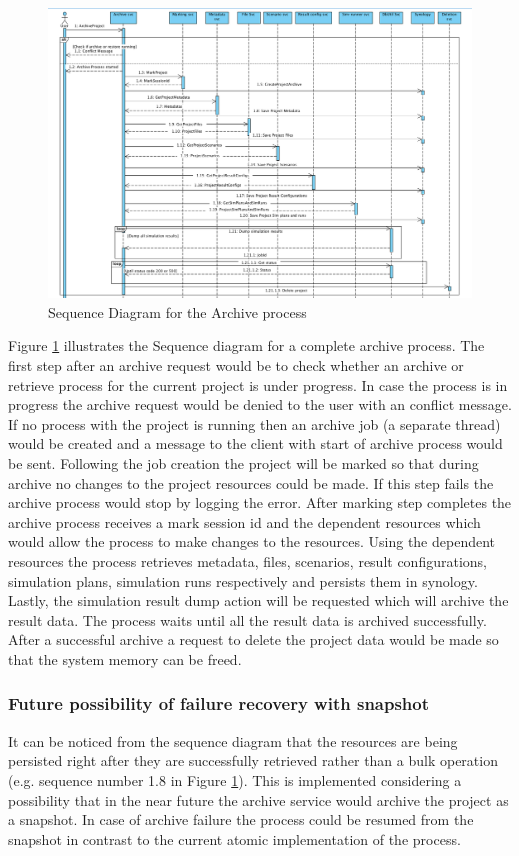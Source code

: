 \newpage
\begin{figure}[H]
    \centering \includegraphics[scale=0.5, angle=90, origin=c]{grafiken/sequenceArchive.png}
    \caption{Sequence Diagram for the Archive process}
    \label{fig:sequenceArchive}
\end{figure}

Figure \ref{fig:sequenceArchive} illustrates the Sequence diagram for a complete archive process. The first step after an archive request would be to check
whether an archive or retrieve process for the current project is under progress. In case the process is in progress the archive request would be denied to the
user with an conflict message. If no process with the project is running then an archive job (a separate thread) would be created and a message to the client with start of archive process would be
sent. Following the job creation the project will be marked so that during archive no changes to the project resources could be made. If this step fails the archive 
process would stop by logging the error. After marking step completes the archive process receives a mark session id and the dependent resources which would allow the process to make
changes to the resources. Using the dependent resources the process retrieves metadata, files, scenarios, result configurations, simulation plans, simulation runs 
respectively and persists them in synology. Lastly, the simulation result dump action will be requested which will archive the result data. The process waits until
all the result data is archived successfully. After a successful archive a request to delete the project data would be made so that the system memory can be freed.

\subsubsection{Future possibility of failure recovery with snapshot}
It can be noticed from the sequence diagram that the resources are being persisted right after they are successfully retrieved rather than a bulk operation
(e.g. sequence number 1.8 in Figure \ref{fig:sequenceArchive}). This
is implemented considering a possibility that in the near future the archive service would archive the project as a snapshot. In case of archive failure the process
could be resumed from the snapshot in contrast to the current atomic implementation of the process.


